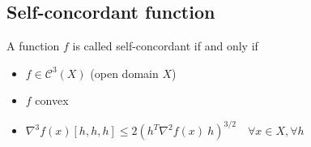 %
%
%
%
%

\subsection{Self-concordant function}
\begin{definition} A function $f$ is called self-concordant if and only if
\begin{itemize}
\item $f \in \mathcal{C}^3(X)$ (open domain $X$)
\item $f$ convex
\item $\nabla^3 f(x) [h,h,h] \leq 2 (h^T \nabla^2 f(x)\ h)^{3/2} \quad \forall x \in X, \forall h$
\end{itemize}
\end{definition}

